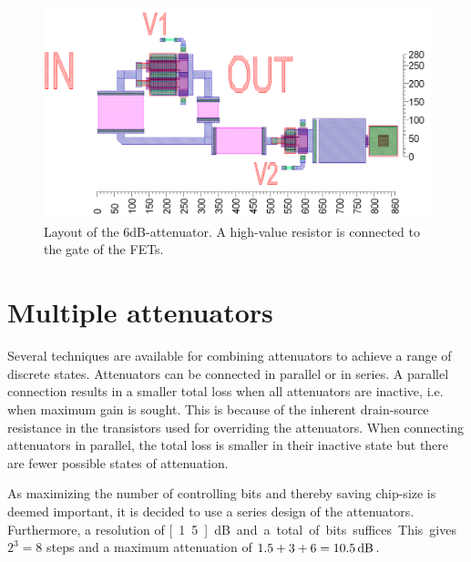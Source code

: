 		\begin{figure}[h!]
			\centering
			\includegraphics[width=1.0\textwidth]{fig/attenuators/tee_att_layout_6dB}
			\caption[Layout of a tee-attenuator]{Layout of the 6dB-attenuator.  A high-value resistor is connected to the gate of the FETs.\scalemum}\label{fig:tee_att_layout}
		\end{figure}
		
		
			

	\section{Multiple attenuators}

		Several techniques are available for combining attenuators to achieve a range of discrete states. Attenuators can be connected in parallel or in series. A parallel connection results in a smaller total loss when all attenuators are inactive, i.e. when maximum gain is sought. This is because of the inherent drain-source resistance in the transistors used for overriding the attenuators. When connecting attenuators in parallel, the total loss is smaller in their inactive state but there are fewer possible states of attenuation.

		As maximizing the number of controlling bits and thereby saving chip-size is deemed important, it is decided to use a series design of the attenuators. Furthermore, a resolution of \unit[1.5]{dB} and a total of \unit[3]{bits} suffices. This gives $2^3=8$ steps and a maximum attenuation of $1.5+3+6=\unit[10.5]{dB}$.

